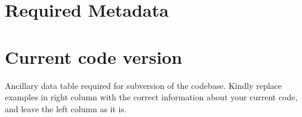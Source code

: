 \documentclass[preprint,letterpaper]{elsarticle}
\begin{document}
%
%
%
%
%


\section*{Required Metadata}

\section*{Current code version}

Ancillary data table required for subversion of the codebase. Kindly replace examples in right column with the correct information about your current code, and leave the left column as it is.
\end{document}
